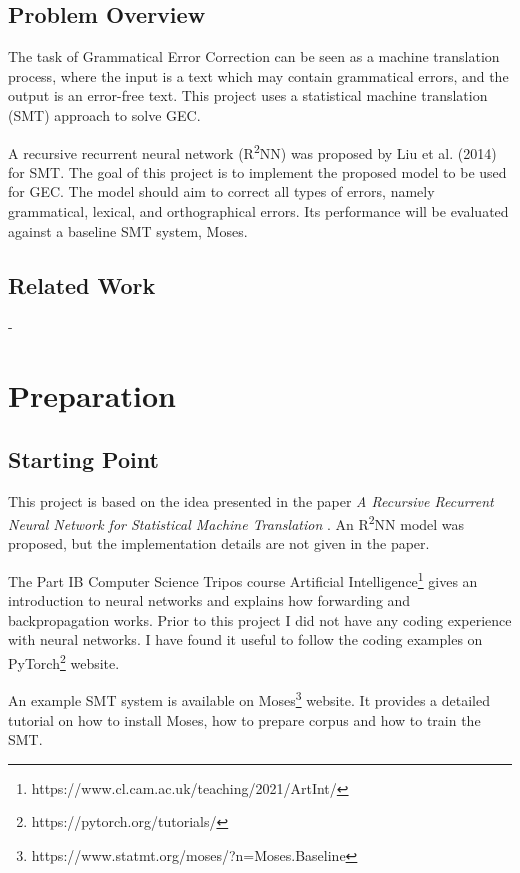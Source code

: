 \documentclass[12pt,a4paper,twoside,openright]{report}
\begin{document}


\section{Problem Overview}

The task of Grammatical Error Correction can be seen as a machine translation process, where the input is a text which may contain grammatical errors, and the output is an error-free text. This project uses a statistical machine translation (SMT) approach to solve GEC.

A recursive recurrent neural network (R\textsuperscript{2}NN) was proposed by Liu et al. (2014) \cite{r2nn} for SMT. The goal of this project is to implement the proposed model to be used for GEC. The model should aim to correct all types of errors, namely grammatical, lexical, and orthographical errors. Its performance will be evaluated against a baseline SMT system, Moses\cite{moses}.


\section{Related Work}
-

\chapter{Preparation}

\section{Starting Point}

This project is based on the idea presented in the paper \textit{A Recursive Recurrent Neural Network for Statistical Machine Translation} \cite{r2nn}. An R\textsuperscript{2}NN model was proposed, but the implementation details are not given in the paper.

The Part IB Computer Science Tripos course Artificial Intelligence\footnote{https://www.cl.cam.ac.uk/teaching/2021/ArtInt/} gives an introduction to neural networks and explains how forwarding and backpropagation works. Prior to this project I did not have any coding experience with neural networks. I have found it useful to follow the coding examples on PyTorch\footnote{https://pytorch.org/tutorials/} website.

An example SMT system is available on Moses\footnote{https://www.statmt.org/moses/?n=Moses.Baseline} website. It provides a detailed tutorial on how to install Moses, how to prepare corpus and how to train the SMT.
\end{document}
